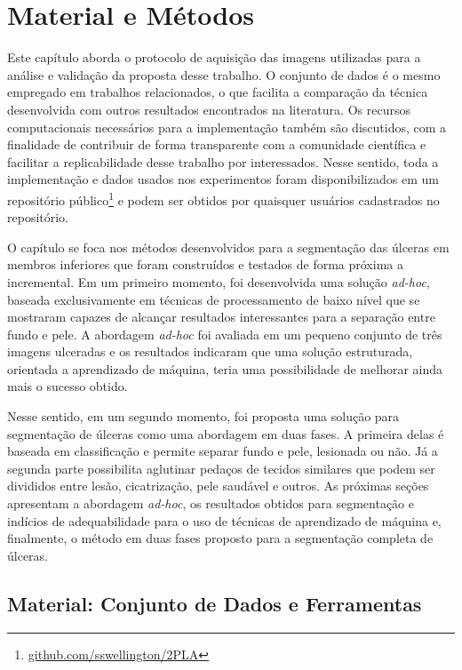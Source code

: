 \clearpage
\section{Material e Métodos}\label{sec:methods}

Este capítulo aborda o protocolo de aquisição das imagens utilizadas para a análise e validação da proposta desse trabalho.
O conjunto de dados é o mesmo empregado em trabalhos relacionados, o que facilita a comparação da técnica desenvolvida com outros resultados encontrados na literatura.
Os recursos computacionais necessários para a implementação também são discutidos, com a finalidade de contribuir de forma transparente com a comunidade científica e facilitar a replicabilidade desse trabalho por interessados.
Nesse sentido, toda a implementação e dados usados nos experimentos foram disponibilizados em um repositório público\footnote{\url{github.com/sswellington/2PLA}} e podem ser obtidos por quaisquer usuários cadastrados no repositório.

O capítulo se foca nos métodos desenvolvidos para a segmentação das úlceras em membros inferiores que foram construídos e testados de forma próxima a incremental.
Em um primeiro momento, foi desenvolvida uma solução \textit{ad-hoc}, baseada exclusivamente em técnicas de processamento de baixo nível que se mostraram capazes de alcançar resultados interessantes para a separação entre fundo e pele.
A abordagem \textit{ad-hoc} foi avaliada em um pequeno conjunto de três imagens ulceradas e os resultados indicaram que uma solução estruturada, orientada a aprendizado de máquina, teria uma possibilidade de melhorar ainda mais o sucesso obtido.

Nesse sentido, em um segundo momento, foi proposta uma solução para segmentação de úlceras como uma abordagem em duas fases.
A primeira delas é baseada em classificação e permite separar fundo e pele, lesionada ou não.
Já a segunda parte possibilita aglutinar pedaços de tecidos similares que podem ser divididos entre lesão, cicatrização, pele saudável e outros.
As próximas seções apresentam a abordagem \textit{ad-hoc}, os resultados obtidos para segmentação e indícios de adequabilidade para o uso de técnicas de aprendizado de máquina e, finalmente, o método em duas fases proposto para a segmentação completa de úlceras.


\subsection{Material: Conjunto de Dados e Ferramentas}

